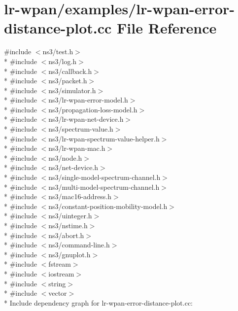 \hypertarget{lr-wpan-error-distance-plot_8cc}{}\section{lr-\/wpan/examples/lr-\/wpan-\/error-\/distance-\/plot.cc File Reference}
\label{lr-wpan-error-distance-plot_8cc}
{\ttfamily \#include $<$ns3/test.\+h$>$}\\*
{\ttfamily \#include $<$ns3/log.\+h$>$}\\*
{\ttfamily \#include $<$ns3/callback.\+h$>$}\\*
{\ttfamily \#include $<$ns3/packet.\+h$>$}\\*
{\ttfamily \#include $<$ns3/simulator.\+h$>$}\\*
{\ttfamily \#include $<$ns3/lr-\/wpan-\/error-\/model.\+h$>$}\\*
{\ttfamily \#include $<$ns3/propagation-\/loss-\/model.\+h$>$}\\*
{\ttfamily \#include $<$ns3/lr-\/wpan-\/net-\/device.\+h$>$}\\*
{\ttfamily \#include $<$ns3/spectrum-\/value.\+h$>$}\\*
{\ttfamily \#include $<$ns3/lr-\/wpan-\/spectrum-\/value-\/helper.\+h$>$}\\*
{\ttfamily \#include $<$ns3/lr-\/wpan-\/mac.\+h$>$}\\*
{\ttfamily \#include $<$ns3/node.\+h$>$}\\*
{\ttfamily \#include $<$ns3/net-\/device.\+h$>$}\\*
{\ttfamily \#include $<$ns3/single-\/model-\/spectrum-\/channel.\+h$>$}\\*
{\ttfamily \#include $<$ns3/multi-\/model-\/spectrum-\/channel.\+h$>$}\\*
{\ttfamily \#include $<$ns3/mac16-\/address.\+h$>$}\\*
{\ttfamily \#include $<$ns3/constant-\/position-\/mobility-\/model.\+h$>$}\\*
{\ttfamily \#include $<$ns3/uinteger.\+h$>$}\\*
{\ttfamily \#include $<$ns3/nstime.\+h$>$}\\*
{\ttfamily \#include $<$ns3/abort.\+h$>$}\\*
{\ttfamily \#include $<$ns3/command-\/line.\+h$>$}\\*
{\ttfamily \#include $<$ns3/gnuplot.\+h$>$}\\*
{\ttfamily \#include $<$fstream$>$}\\*
{\ttfamily \#include $<$iostream$>$}\\*
{\ttfamily \#include $<$string$>$}\\*
{\ttfamily \#include $<$vector$>$}\\*
Include dependency graph for lr-\/wpan-\/error-\/distance-\/plot.cc\+:
